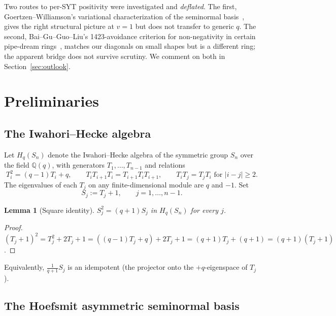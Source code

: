 \documentclass[11pt]{article}
\newtheorem{lemma}[theorem]{Lemma}
\theoremstyle{definition}
\newcommand{\Hq}{H_q}
\newcommand{\Sn}{S_n}
\begin{document}
Two routes to per-SYT positivity were investigated and \emph{deflated}.  The first, Goertzen--Williamson's variational characterization of the seminormal basis~\cite{goertzenwilliamson2026variational}, gives the right structural picture at $v = 1$ but does not transfer to generic $q$.  The second, Bai--Gu--Guo--Liu's 1423-avoidance criterion for non-negativity in certain pipe-dream rings~\cite{baigugou2026},  matches our diagonals on small shapes but is a different ring; the apparent bridge does not survive scrutiny.  We comment on both in Section~\ref{sec:outlook}.

\section{Preliminaries}\label{sec:prelim}

\subsection{The Iwahori--Hecke algebra}

Let $\Hq(\Sn)$ denote the Iwahori--Hecke algebra of the symmetric group $S_n$ over the field $\mathbb{Q}(q)$, with generators $T_1, \ldots, T_{n-1}$ and relations
\[
   T_i^2 = (q-1)T_i + q,
   \qquad T_iT_{i+1}T_i = T_{i+1}T_iT_{i+1},
   \qquad T_iT_j = T_jT_i \text{ for } |i-j| \ge 2.
\]
The eigenvalues of each $T_j$ on any finite-dimensional module are $q$ and $-1$.  Set
\[
   S_j := T_j + 1,\qquad j = 1, \ldots, n-1.
\]

\begin{lemma}[Square identity]\label{lem:S-square}
$S_j^2 = (q+1) S_j$ in $\Hq(\Sn)$ for every $j$.
\end{lemma}

\begin{proof}
$(T_j+1)^2 = T_j^2 + 2T_j + 1 = ((q-1)T_j + q) + 2T_j + 1 = (q+1)T_j + (q+1) = (q+1)(T_j+1)$.
\end{proof}

Equivalently, $\frac{1}{q+1} S_j$ is an idempotent (the projector onto the $+q$-eigenspace of $T_j$).

\subsection{The Hoefsmit asymmetric seminormal basis}
\end{document}
